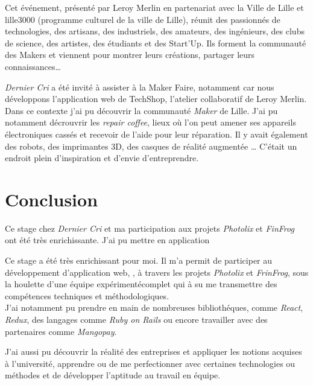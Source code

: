 \documentclass[12pt,a4paper]{article}
\begin{document}
  \bigskip

  Cet événement, présenté par Leroy Merlin en partenariat avec la Ville de
  Lille et lille3000 (programme culturel de la ville de Lille), réunit des
  passionnés de technologies, des artisans, des industriels, des amateurs,
  des ingénieurs, des clubs de science, des artistes, des étudiants et des
  Start'Up. Ils forment la communauté des Makers et viennent pour montrer
  leurs créations, partager leurs connaissances\ldots{}

  \bigskip

  \emph{Dernier Cri} a été invité à assister à la Maker Faire, notamment
  car nous développons l'application web de TechShop, l'atelier
  collaboratif de Leroy Merlin. Dans ce contexte j'ai pu découvrir la
  communauté \emph{Maker} de Lille. J'ai pu notamment décrouvrir les
  \emph{repair coffee}, lieux où l'on peut amener ses appareils
  électroniques cassés et recevoir de l'aide pour leur réparation. Il y
  avait également des robots, des imprimantes 3D, des casques de réalité
  augmentée \ldots{} C'était un endroit plein d'inspiration et d'envie
  d'entreprendre.

  \newpage

  \section{Conclusion}\label{conclusion-2}

  Ce stage chez \emph{Dernier Cri} et ma participation aux projets
  \emph{Photolix} et \emph{FinFrog} ont été très enrichissante. J'ai pu
  mettre en application

  \bigskip

  Ce stage a été très enrichissant pour moi. Il m'a permit de participer
  au développement d'application web, , à travers les projets
  \emph{Photolix} et \emph{FrinFrog}, sous la houlette d'une équipe
  expérimentécomplet qui à su me transmettre des compétences techniques et
  méthodologiques.\\
  J'ai notamment pu prendre en main de nombreuses bibliothéques, comme
  \emph{React}, \emph{Redux}, des langages comme \emph{Ruby on Rails} ou
  encore travailler avec des partenaires comme \emph{Mangopay}.

  \bigskip

  J'ai aussi pu découvrir la réalité des entreprises et appliquer les
  notions acquises à l'université, apprendre ou de me perfectionner avec
  certaines technologies ou méthodes et de développer l'aptitude au
  travail en équipe.
\end{document}
